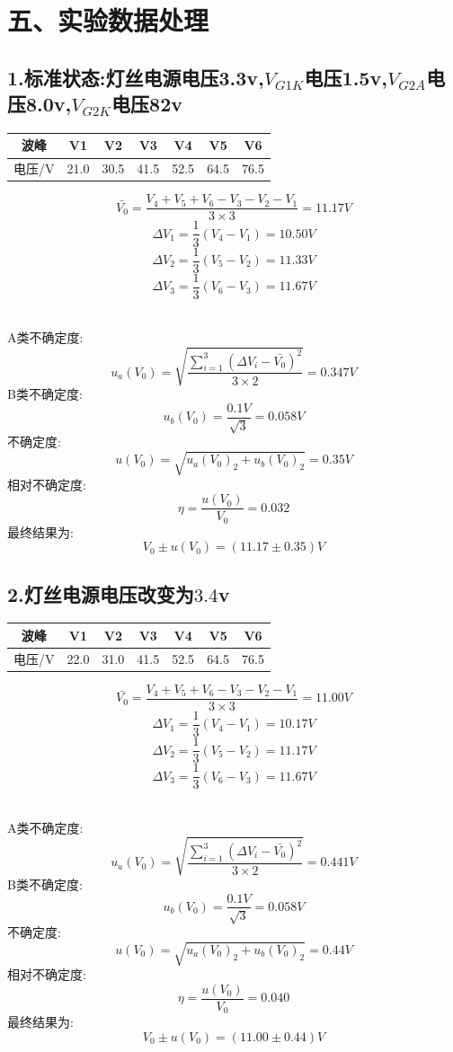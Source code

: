 \documentclass[11pt,a4paper,oneside]{article}
\begin{document}
\section*{五、实验数据处理}
\subsection*{1.标准状态:灯丝电源电压3.3v,$V_{G1K}$电压1.5v,$V_{G2A}$电压8.0v,$V_{G2K}$电压82v}
\begin{center}
\begin{tabular}{|c|c|c|c|c|c|c|}
	\hline
	波峰&V1&V2&V3&V4&V5&V6
	\\\hline
	电压/V&21.0&30.5&41.5&52.5&64.5&76.5\\\hline
	\end{tabular}
	\end{center}

$$  \bar{V_0}=\frac{V_4+V_5+V_6-V_3-V_2-V_1}{3\times 3}=11.17V $$
$$	\Delta V_1=\frac{1}{3}(V_4-V_1)=10.50V $$
$$	\Delta V_2=\frac{1}{3}(V_5-V_2)=11.33V $$
$$	\Delta V_3=\frac{1}{3}(V_6-V_3)=11.67V $$ 

\ \\
A类不确定度:
$$	u_a(V_0)=\sqrt{\frac{\sum\limits_{i=1}^{3} (\Delta V_i-\bar{V_0})^2}{3\times 2}}=0.347V $$
B类不确定度:
$$	u_b(V_0)=\frac{0.1V}{\sqrt{3}}=0.058V $$
不确定度:
$$	u(V_0)=\sqrt{u_a(V_0)_2+u_b(V_0)_2}=0.35V $$
相对不确定度:
$$	\eta=\frac{u(V_0)}{V_0}=0.032 $$
最终结果为:
$$	V_0 \pm u(V_0) = (11.17 \pm 0.35)V $$


\subsection*{2.灯丝电源电压改变为$3.4$v}
\begin{center}
\begin{tabular}{|c|c|c|c|c|c|c|}
	\hline
	波峰&V1&V2&V3&V4&V5&V6
	\\\hline
	电压/V&22.0&31.0&41.5&52.5&64.5&76.5\\\hline
	\end{tabular}
	\end{center}

$$  \bar{V_0}=\frac{V_4+V_5+V_6-V_3-V_2-V_1}{3\times 3}=11.00V $$
$$	\Delta V_1=\frac{1}{3}(V_4-V_1)=10.17V $$
$$	\Delta V_2=\frac{1}{3}(V_5-V_2)=11.17V $$
$$	\Delta V_3=\frac{1}{3}(V_6-V_3)=11.67V $$ 

\ \\
A类不确定度:
$$	u_a(V_0)=\sqrt{\frac{\sum\limits_{i=1}^{3} (\Delta V_i-\bar{V_0})^2}{3\times 2}}=0.441V $$
B类不确定度:
$$	u_b(V_0)=\frac{0.1V}{\sqrt{3}}=0.058V $$
不确定度:
$$	u(V_0)=\sqrt{u_a(V_0)_2+u_b(V_0)_2}=0.44V $$
相对不确定度:
$$	\eta=\frac{u(V_0)}{V_0}=0.040 $$
最终结果为:
$$	V_0 \pm u(V_0) = (11.00 \pm 0.44)V $$
\end{document}
